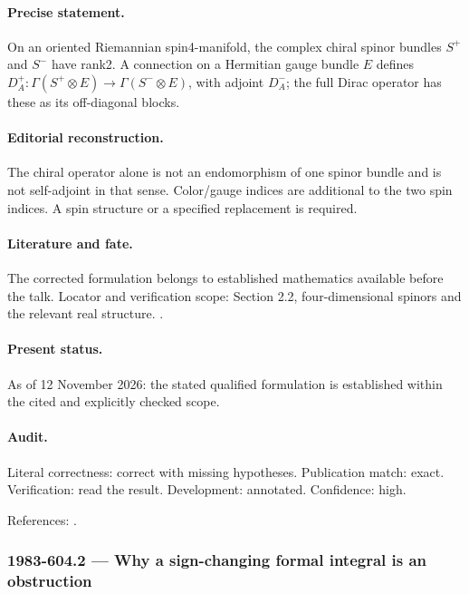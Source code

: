 \paragraph{Precise statement.} On an oriented Riemannian spin4-manifold, the complex chiral spinor bundles \(S^+\) and \(S^-\) have rank2. A connection on a Hermitian gauge bundle \(E\) defines \(D_A^+:\Gamma(S^+\otimes E)\to\Gamma(S^-\otimes E)\), with adjoint \(D_A^-\); the full Dirac operator has these as its off-diagonal blocks.

\paragraph{Editorial reconstruction.} The chiral operator alone is not an endomorphism of one spinor bundle and is not self-adjoint in that sense. Color/gauge indices are additional to the two spin indices. A spin structure or a specified replacement is required.

\paragraph{Literature and fate.} The corrected formulation belongs to established mathematics available before the talk. Locator and verification scope: Section 2.2, four-dimensional spinors and the relevant real structure. \cite{wangwenwitten2019new}.

\paragraph{Present status.} As of 12 November 2026: the stated qualified formulation is established within the cited and explicitly checked scope.

\paragraph{Audit.} Literal correctness: correct with missing hypotheses. Publication match: exact. Verification: read the result. Development: annotated. Confidence: high.

\noindent References: \citep{wangwenwitten2019new}.\par

\subsubsection{1983-604.2 --- Why a sign-changing formal integral is an obstruction}

\label{item:1983-604.2}

